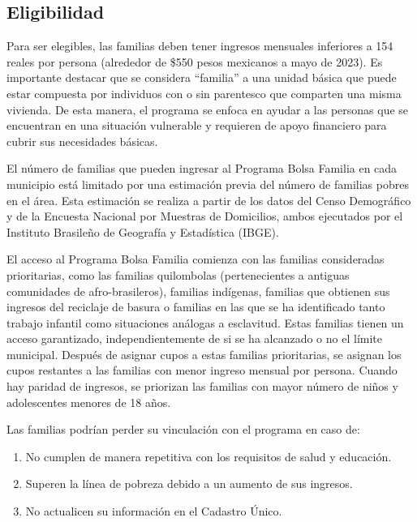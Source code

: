 \documentclass[
]{article}
\providecommand{\tightlist}{%
  \setlength{\itemsep}{0pt}\setlength{\parskip}{0pt}}
\begin{document}
\hypertarget{eligibilidad}{%
\subsection{Eligibilidad}\label{eligibilidad}}

Para ser elegibles, las familias deben tener ingresos mensuales
inferiores a 154 reales por persona (alrededor de \$550 pesos mexicanos
a mayo de 2023). Es importante destacar que se considera ``familia'' a
una unidad básica que puede estar compuesta por individuos con o sin
parentesco que comparten una misma vivienda. De esta manera, el programa
se enfoca en ayudar a las personas que se encuentran en una situación
vulnerable y requieren de apoyo financiero para cubrir sus necesidades
básicas.

El número de familias que pueden ingresar al Programa Bolsa Familia en
cada municipio está limitado por una estimación previa del número de
familias pobres en el área. Esta estimación se realiza a partir de los
datos del Censo Demográfico y de la Encuesta Nacional por Muestras de
Domicilios, ambos ejecutados por el Instituto Brasileño de Geografía y
Estadística (IBGE).

El acceso al Programa Bolsa Familia comienza con las familias
consideradas prioritarias, como las familias quilombolas (pertenecientes
a antiguas comunidades de afro-brasileros), familias indígenas, familias
que obtienen sus ingresos del reciclaje de basura o familias en las que
se ha identificado tanto trabajo infantil como situaciones análogas a
esclavitud. Estas familias tienen un acceso garantizado,
independientemente de si se ha alcanzado o no el límite municipal.
Después de asignar cupos a estas familias prioritarias, se asignan los
cupos restantes a las familias con menor ingreso mensual por persona.
Cuando hay paridad de ingresos, se priorizan las familias con mayor
número de niños y adolescentes menores de 18 años.

Las familias podrían perder su vinculación con el programa en caso de:

\begin{enumerate}
\def\labelenumi{\arabic{enumi}.}
\tightlist
\item
  No cumplen de manera repetitiva con los requisitos de salud y
  educación.
\item
  Superen la línea de pobreza debido a un aumento de sus ingresos.
\item
  No actualicen su información en el Cadastro Único.
\end{enumerate}
\end{document}
